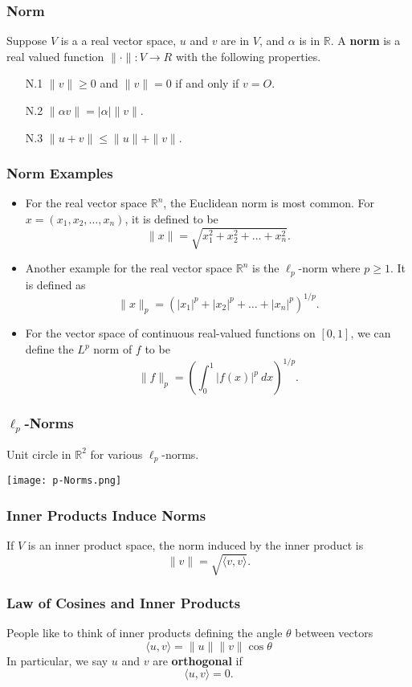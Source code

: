 \documentclass{beamer}
\begin{document}
\begin{frame}
\frametitle{Norm}
\begin{Definition}
Suppose $V$ is a a real vector space, $u$ and $v$ are in $V$, and $\alpha$ is in $\mathbb{R}$. A {\bf norm} is a real valued function $\|\cdot\|: V\to R$  with the following properties.
\begin{enumerate}
\item[N.1] $\| v\| \geq 0$ and $\| v\| = 0$ if and only if $v = O$.
\item[N.2] $\|\alpha v\| = |\alpha| \| v\|$.
\item[N.3] $\| u + v\| \leq \| u\| + \| v\|$.
\end{enumerate}
\end{Definition}
\end{frame}

\begin{frame}
\frametitle{Norm Examples}
\begin{itemize}
\item For the real vector space $\mathbb{R}^n$, the Euclidean norm is most common. For $x = \left(x_1, x_2, \ldots, x_n\right)$, it is defined to be
$$
\| x\| = \sqrt{x_1^2 + x_2^2 +\ldots + x_n^2}.
$$
\item Another example for the real vector space $\mathbb{R}^n$ is the $\ell_p$-norm where $p\geq 1$. It is defined as
$$
\| x\|_p = \left(|x_1|^p + |x_2|^p + \ldots + |x_n|^p\right)^{1/p}.
$$
\item For the vector space of continuous real-valued functions on $[0, 1]$, we can define the $L^p$ norm of $f$ to be
$$
\| f\|_p = \left(\int_0^1 |f(x)|^p\ dx\right)^{1/p}.
$$
\end{itemize}
\end{frame}

\begin{frame}
\frametitle{$\boldsymbol \ell_p$-Norms}
Unit circle in $\mathbb{R}^2$ for various $\ell_p$-norms.
\begin{center}
\texttt{[image: p-Norms.png]}
\end{center}

\end{frame}

\begin{frame}
\frametitle{Inner Products Induce Norms}
If $V$ is an inner product space, the norm induced by the inner product is
$$
\| v\| = \sqrt{\langle v, v\rangle}.
$$
\end{frame}

\begin{frame}[t]
\frametitle{Law of Cosines and Inner Products}
People like to think of inner products defining the angle $\theta$ between vectors
$$
\langle u, v\rangle = \| u\| \|v\|\cos\theta
$$
In particular, we say $u$ and $v$ are {\bf orthogonal} if
$$
\langle u, v\rangle = 0.
$$
\end{frame}
\end{document}
